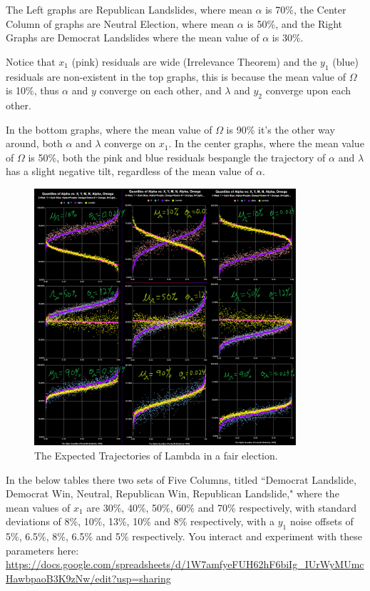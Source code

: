 \documentclass[preprint,13pt]{elsarticle}
\begin{document}
The Left graphs are Republican Landslides, where mean $\alpha$ is 70\%, the Center Column of graphs are Neutral Election, where mean $\alpha$ is 50\%, and the Right Graphs are Democrat Landslides where the mean value of $\alpha$ is 30\%.

Notice that $x_{1}$ (pink) residuals are wide (Irrelevance Theorem) and the $y_{1}$ (blue) residuals are non-existent in the top graphs, this is because the mean value of $\Omega$ is 10\%, thus $\alpha$ and $y$ converge on each other, and $\lambda$ and $y_{2}$ converge upon each other.

In the bottom graphs, where the mean value of $\Omega$ is 90\% it's the other way around, both $\alpha$ and $\lambda$ converge on $x_{1}$. In the center graphs, where the mean value of $\Omega$ is 50\%, both the pink and blue residuals bespangle the trajectory of $\alpha$ and $\lambda$ has a slight negative tilt, regardless of the mean value of $\alpha$.
\begin{figure}[bp!]
\begin{center}
\caption{The Expected Trajectories of Lambda in a fair election.}
\includegraphics[width=275pt]{Fair Lambda.png}
\end{center}
\end{figure}
\newpage
In the below tables there two sets of Five Columns, titled ``Democrat Landslide, Democrat Win, Neutral, Republican Win, Republican Landslide," where the mean values of $x_{1}$ are 30\%, 40\%, 50\%, 60\% and 70\% respectively, with standard deviations of 8\%, 10\%, 13\%, 10\% and 8\% respectively, with a $y_{1}$ noise offsets of 5\%, 6.5\%, 8\%, 6.5\% and 5\% respectively. You interact and experiment with these parameters here: \url{https://docs.google.com/spreadsheets/d/1W7amfyeFUH62hF6biIg_IUrWyMUmcHawbpaoB3K9zNw/edit?usp=sharing}
\end{document}

